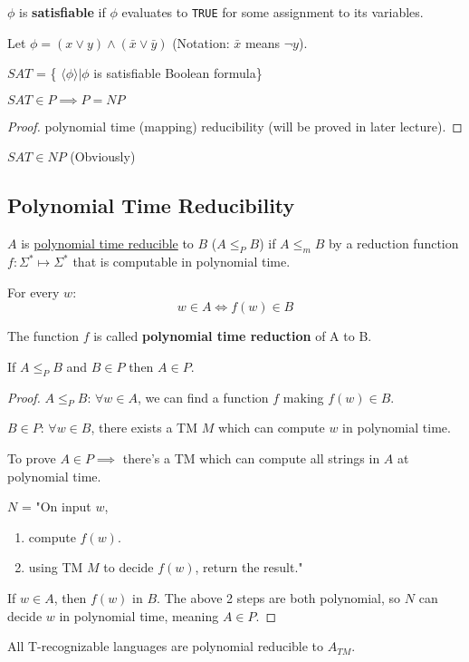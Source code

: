 \begin{definition}
    \(\phi\) is \textbf{satisfiable} if \(\phi\) evaluates to \verb|TRUE| for some assignment to its variables. 
\end{definition}

\begin{example}
    Let \(\phi = (x \lor y) \land (\bar{x} \lor \bar{y})\) (Notation: \(\bar{x}\) means \(\neg y\)). 
\end{example}

\begin{definition}
    \(SAT\) = \{ \(\langle \phi \rangle | \phi\) is satisfiable Boolean formula\} 
\end{definition}

\begin{definition}
    \(SAT \in P \implies P = NP\)  
\end{definition}
\begin{proof}
    polynomial time (mapping) reducibility (will be proved in later lecture). 
\end{proof}

\begin{remark}
        \(SAT \in NP\) (Obviously)
\end{remark}

\subsection{Polynomial Time Reducibility}
\begin{definition}
    \(A\) is \underline{polynomial time reducible} to \(B\) (\(A \leq_P B\))  if \(A \leq_m B\) by a reduction function \(f: \Sigma^* \mapsto \Sigma^*\) that is computable in polynomial time.

    For every \(w\):
    \[
        w \in A \iff f(w) \in B
    \]

    The function \(f\) is called \textbf{polynomial time reduction} of A to B.
\end{definition}
\begin{theorem}
    If \( A \leq_P B\) and \(B \in P\) then \(A \in P\). 
\end{theorem}
\begin{proof}
    \(A \leq_P B\): \(\forall w \in A\), we can find a function \(f\) making \(f(w) \in B\).    

    \(B \in P\): \(\forall w \in B\), there exists a TM \(M\) which can compute \(w\) in polynomial time.  

    To prove \(A \in P \implies\) there's a TM which can compute all strings in \(A\) at polynomial time.    

    \(N\) = "On input \(w\),
    \begin{enumerate}
        \item compute \(f(w)\).
        \item using TM \(M\) to decide \(f(w)\), return the result."     
    \end{enumerate}  

    If \(w \in A\), then \(f(w)\) in \(B\). 
    The above 2 steps are both polynomial, so \(N\) can decide \(w\) in polynomial time, 
    meaning \(A \in P\). 
\end{proof}

\begin{note}
    All T-recognizable languages are polynomial reducible to \(A_{TM}\).   
\end{note}